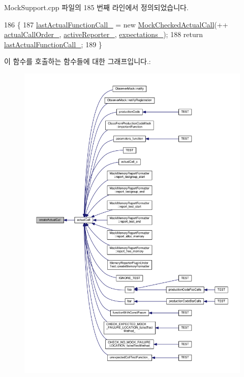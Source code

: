 Mock\+Support.\+cpp 파일의 185 번째 라인에서 정의되었습니다.


\begin{DoxyCode}
186 \{
187     \hyperlink{class_mock_support_aadd48976efe51d36597ebe298e6b9233}{lastActualFunctionCall\_} = \textcolor{keyword}{new} \hyperlink{class_mock_checked_actual_call}{MockCheckedActualCall}(++
      \hyperlink{class_mock_support_a58e873078e053e6b06ad68a8a7e0c313}{actualCallOrder\_}, \hyperlink{class_mock_support_a75833f9457ebccff4c6e8b55529313fb}{activeReporter\_}, \hyperlink{class_mock_support_a8f02a0b866ff54bef3fb38cd8bc57fa2}{expectations\_});
188     \textcolor{keywordflow}{return} \hyperlink{class_mock_support_aadd48976efe51d36597ebe298e6b9233}{lastActualFunctionCall\_};
189 \}
\end{DoxyCode}


이 함수를 호출하는 함수들에 대한 그래프입니다.\+:
\nopagebreak
\begin{figure}[H]
\begin{center}
\leavevmode
\includegraphics[width=350pt]{class_mock_support_a58f4dfd3e9682829a8815c7b9de986d0_icgraph}
\end{center}
\end{figure}


